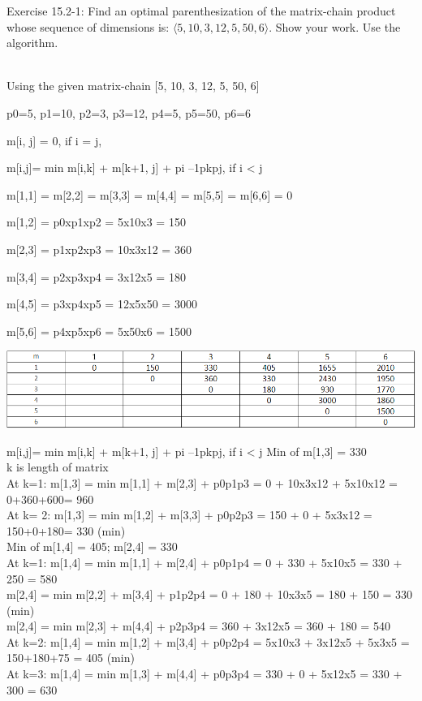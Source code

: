 \documentclass[addpoints,11pt]{exam}
\begin{document}
\begin{questions}
\ifprintanswers
\newpage
\else
\bigskip
\fi


%
%
\question[5]
Exercise 15.2-1: Find an optimal parenthesization of the matrix-chain product whose sequence of dimensions is: $\langle 5, 10, 3, 12, 5, 50, 6 \rangle.$ Show your work.  Use the algorithm.
\begin{solutionorbox}
\\
Using the given matrix-chain [5, 10, 3, 12, 5, 50, 6]

p0=5, p1=10, p2=3, p3=12, p4=5, p5=50, p6=6

m[i, j] = 0, if i = j,

m[i,j]= {min {m[i,k] + m[k+1, j] + pi –1pkpj}}, if i < j          



m[1,1] = m[2,2] = m[3,3] = m[4,4] = m[5,5] = m[6,6] = 0



m[1,2] = p0xp1xp2 = 5x10x3 = 150

m[2,3] = p1xp2xp3 = 10x3x12 = 360

m[3,4] = p2xp3xp4 = 3x12x5 = 180

m[4,5] = p3xp4xp5 = 12x5x50 = 3000

m[5,6] = p4xp5xp6 = 5x50x6 = 1500

\includegraphics[scale=.75]{Image1.png}

m[i,j]= {min {m[i,k] + m[k+1, j] + pi –1pkpj}}, if i < j          
	Min of m[1,3] = 330\\
k is length of matrix\\
At k=1: m[1,3] = {min {m[1,1] + m[2,3] + p0p1p3}}  = 0 + 10x3x12 + 5x10x12 =  0+360+600= 960\\
At k= 2: m[1,3] = {min {m[1,2] + m[3,3] + p0p2p3}} = 150 + 0 + 5x3x12 = 150+0+180= 330 (min)\\

Min of m[1,4] = 405; m[2,4] = 330\\
At k=1: m[1,4] = {min {m[1,1] + m[2,4] + p0p1p4}} = 0 + 330 + 5x10x5 = 330 + 250 = 580\\
\hspace*{5mm}m[2,4] = {min {m[2,2] + m[3,4] + p1p2p4}} = 0 + 180 + 10x3x5 = 180 + 150 = 330 (min)\\
\hspace*{5mm}m[2,4] = {min {m[2,3] + m[4,4] + p2p3p4}} = 360 + 3x12x5 = 360 + 180 = 540\\
At k=2: m[1,4] = {min {m[1,2] + m[3,4] + p0p2p4}}  = 5x10x3 + 3x12x5 + 5x3x5 = 150+180+75 = 405 (min)\\
At k=3: m[1,4] = {min {m[1,3] + m[4,4] + p0p3p4}}  = 330 + 0 + 5x12x5 = 330 + 300 = 630\\


\end{solutionorbox}
\end{questions}
\end{document}

